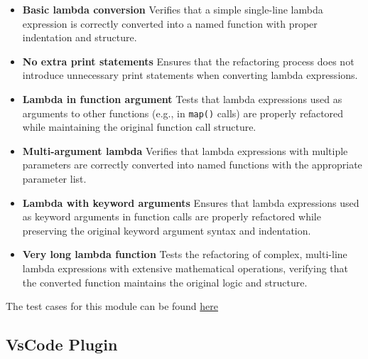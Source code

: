 \documentclass[12pt, titlepage]{article}
\begin{document}
  \begin{itemize}
    \item \textbf{Basic lambda conversion} \newline
      Verifies that a simple single-line lambda expression is
      correctly converted into a named function with proper
      indentation and structure.

    \item \textbf{No extra print statements} \newline
      Ensures that the refactoring process does not introduce
      unnecessary print statements when converting lambda expressions.

    \item \textbf{Lambda in function argument} \newline
      Tests that lambda expressions used as arguments to other
      functions (e.g., in \texttt{map()} calls) are properly
      refactored while maintaining the original function call structure.

    \item \textbf{Multi-argument lambda} \newline
      Verifies that lambda expressions with multiple parameters are
      correctly converted into named functions with the appropriate
      parameter list.

    \item \textbf{Lambda with keyword arguments} \newline
      Ensures that lambda expressions used as keyword arguments in
      function calls are properly refactored while preserving the
      original keyword argument syntax and indentation.

    \item \textbf{Very long lambda function} \newline
      Tests the refactoring of complex, multi-line lambda expressions
      with extensive mathematical operations, verifying that the
      converted function maintains the original logic and structure.
  \end{itemize}

  \noindent The test cases for this module can be found
  \href{https://github.com/ssm-lab/capstone--source-code-optimizer/blob/new-poc/tests/refactorers/test_long_lambda_element_refactoring.py}{here}

  \subsection{VsCode Plugin}
\end{document}
